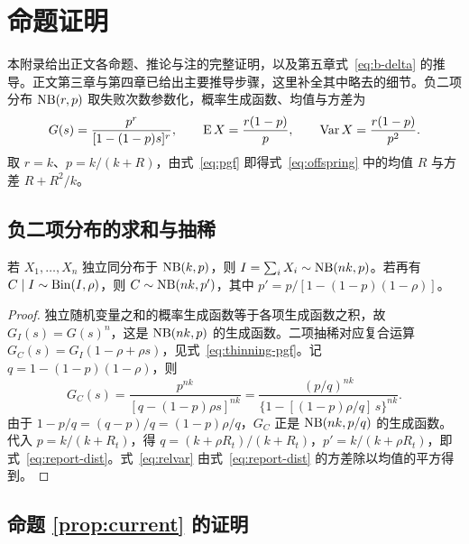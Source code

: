 \chapter{命题证明}
\label{chap:proofs}

本附录给出正文各命题、推论与注的完整证明，以及第五章式~\eqref{eq:b-delta} 的推导。正文第三章与第四章已给出主要推导步骤，这里补全其中略去的细节。负二项分布 $\operatorname{NB}(r,p)$ 取失败次数参数化，概率生成函数、均值与方差为
\begin{equation}
  G(s)=\frac{p^{r}}{[1-(1-p)s]^{r}},\qquad \operatorname{E} X=\frac{r(1-p)}{p},\qquad \operatorname{Var} X=\frac{r(1-p)}{p^2}.
  \label{eq:pgf}
\end{equation}
取 $r=k$、$p=k/(k+R)$，由式~\eqref{eq:pgf} 即得式~\eqref{eq:offspring} 中的均值 $R$ 与方差 $R+R^2/k$。

\section{负二项分布的求和与抽稀}
\label{app:lemma}

\begin{lemma}
\label{lem:nb-thinning}
若 $X_1,\dots,X_n$ 独立同分布于 $\operatorname{NB}(k,p)$，则 $I=\sum_iX_i\sim\operatorname{NB}(nk,p)$。若再有 $C\mid I\sim\operatorname{Bin}(I,\rho)$，则 $C\sim\operatorname{NB}(nk,p')$，其中 $p'=p/[1-(1-p)(1-\rho)]$。
\end{lemma}

\begin{proof}
独立随机变量之和的概率生成函数等于各项生成函数之积，故 $G_I(s)=G(s)^n$，这是 $\operatorname{NB}(nk,p)$ 的生成函数。二项抽稀对应复合运算 $G_C(s)=G_I(1-\rho+\rho s)$，见式~\eqref{eq:thinning-pgf}。记 $q=1-(1-p)(1-\rho)$，则
\begin{equation*}
  G_C(s)=\frac{p^{nk}}{[q-(1-p)\rho s]^{nk}}=\frac{(p/q)^{nk}}{\{1-[(1-p)\rho/q]\,s\}^{nk}}.
\end{equation*}
由于 $1-p/q=(q-p)/q=(1-p)\rho/q$，$G_C$ 正是 $\operatorname{NB}(nk,p/q)$ 的生成函数。代入 $p=k/(k+R_t)$，得 $q=(k+\rho R_t)/(k+R_t)$，$p'=k/(k+\rho R_t)$，即式~\eqref{eq:report-dist}。式~\eqref{eq:relvar} 由式~\eqref{eq:report-dist} 的方差除以均值的平方得到。
\end{proof}

\section{\texorpdfstring{命题 \ref{prop:current} 的证明}{命题 3.1 的证明}}
\label{app:current}


